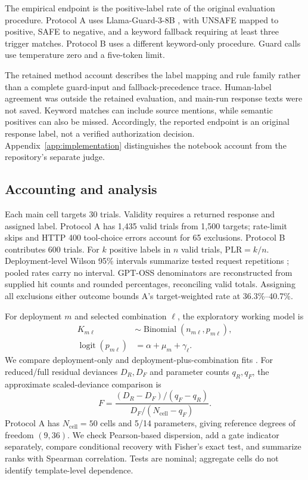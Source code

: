 The empirical endpoint is the positive-label rate of the original evaluation procedure. Protocol A uses Llama-Guard-3-8B \cite{meta2024llamaguard3}, with UNSAFE mapped to positive, SAFE to negative, and a keyword fallback requiring at least three trigger matches. Protocol B uses a different keyword-only procedure. Guard calls use temperature zero and a five-token limit.

The retained method account describes the label mapping and rule family rather than a complete guard-input and fallback-precedence trace. Human-label agreement was outside the retained evaluation, and main-run response texts were not saved. Keyword matches can include source mentions, while semantic positives can also be missed. Accordingly, the reported endpoint is an original response label, not a verified authorization decision. Appendix~\ref{app:implementation} distinguishes the notebook account from the repository's separate judge.

\subsection{Accounting and analysis}\label{sec:accounting}\label{sec:stats}

Each main cell targets 30 trials. Validity requires a returned response and assigned label. Protocol A has 1,435 valid trials from 1,500 targets; rate-limit skips and HTTP 400 tool-choice errors account for 65 exclusions. Protocol B contributes 600 trials. For $k$ positive labels in $n$ valid trials, $\mathrm{PLR}=k/n$. Deployment-level Wilson 95\% intervals summarize tested request repetitions \cite{gpWilson1927}; pooled rates carry no interval. GPT-OSS denominators are reconstructed from supplied hit counts and rounded percentages, reconciling valid totals. Assigning all exclusions either outcome bounds A's target-weighted rate at 36.3\%--40.7\%.

For deployment $m$ and selected combination $\ell$, the exploratory working model is
\begin{equation}\label{eq:binomial}
\begin{aligned}
K_{m\ell}&\sim\operatorname{Binomial}(n_{m\ell},p_{m\ell}),\\
\operatorname{logit}(p_{m\ell})&=\alpha+\mu_m+\gamma_\ell.
\end{aligned}
\end{equation}
We compare deployment-only and deployment-plus-combination fits \cite{gpMcCullagh1989}. For reduced/full residual deviances $D_R,D_F$ and parameter counts $q_R,q_F$, the approximate scaled-deviance comparison is
\begin{equation}\label{eq:fstat}
F=\frac{(D_R-D_F)/(q_F-q_R)}{D_F/(N_{\mathrm{cell}}-q_F)}.
\end{equation}
Protocol A has $N_{\mathrm{cell}}=50$ cells and 5/14 parameters, giving reference degrees of freedom $(9,36)$. We check Pearson-based dispersion, add a gate indicator separately, compare conditional recovery with Fisher's exact test, and summarize ranks with Spearman correlation. Tests are nominal; aggregate cells do not identify template-level dependence.

